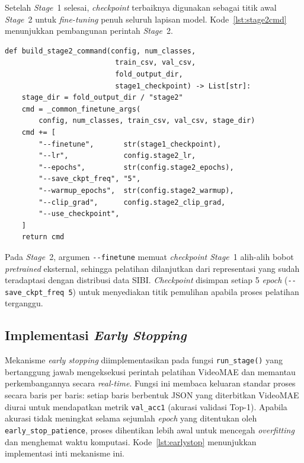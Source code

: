 Setelah \textit{Stage}~1 selesai, \textit{checkpoint} terbaiknya digunakan sebagai titik awal \textit{Stage}~2 untuk \textit{fine-tuning} penuh seluruh lapisan model. Kode~\ref{lst:stage2cmd} menunjukkan pembangunan perintah \textit{Stage}~2.\par

\begin{lstlisting}[caption={Kode pembangunan perintah \textit{Stage} 2 VideoMAE}, label={lst:stage2cmd}]
def build_stage2_command(config, num_classes,
                          train_csv, val_csv,
                          fold_output_dir,
                          stage1_checkpoint) -> List[str]:
    stage_dir = fold_output_dir / "stage2"
    cmd = _common_finetune_args(
        config, num_classes, train_csv, val_csv, stage_dir)
    cmd += [
        "--finetune",       str(stage1_checkpoint),
        "--lr",             config.stage2_lr,
        "--epochs",         str(config.stage2_epochs),
        "--save_ckpt_freq", "5",
        "--warmup_epochs",  str(config.stage2_warmup),
        "--clip_grad",      config.stage2_clip_grad,
        "--use_checkpoint",
    ]
    return cmd
\end{lstlisting}

Pada \textit{Stage}~2, argumen \texttt{-{}-finetune} memuat \textit{checkpoint Stage}~1 alih-alih bobot \textit{pretrained} eksternal, sehingga pelatihan dilanjutkan dari representasi yang sudah teradaptasi dengan distribusi data SIBI. \textit{Checkpoint} disimpan setiap 5 \textit{epoch} (\texttt{-{}-save\_ckpt\_freq 5}) untuk menyediakan titik pemulihan apabila proses pelatihan terganggu.\par

\subsection{Implementasi \textit{Early Stopping}} \label{IV.EarlyStopping}

Mekanisme \textit{early stopping} diimplementasikan pada fungsi \texttt{run\_stage()} yang bertanggung jawab mengeksekusi perintah pelatihan VideoMAE dan memantau perkembangannya secara \textit{real-time}. Fungsi ini membaca keluaran standar proses secara baris per baris: setiap baris berbentuk JSON yang diterbitkan VideoMAE diurai untuk mendapatkan metrik \texttt{val\_acc1} (akurasi validasi Top-1). Apabila akurasi tidak meningkat selama sejumlah \textit{epoch} yang ditentukan oleh \texttt{early\_stop\_patience}, proses dihentikan lebih awal untuk mencegah \textit{overfitting} dan menghemat waktu komputasi. Kode~\ref{lst:earlystop} menunjukkan implementasi inti mekanisme ini.\par

